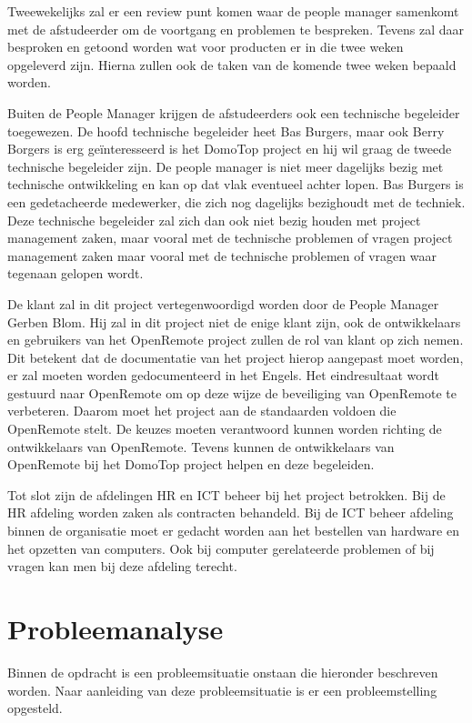 \documentclass[]{article}
\begin{document}
Tweewekelijks zal er een review punt komen waar de people manager
samenkomt met de afstudeerder om de voortgang en problemen te bespreken.
Tevens zal daar besproken en getoond worden wat voor producten er in die twee weken
opgeleverd zijn. Hierna zullen ook de taken van de komende twee weken
bepaald worden.

Buiten de People Manager krijgen de afstudeerders ook een technische
begeleider toegewezen. De hoofd technische begeleider heet Bas Burgers,
maar ook Berry Borgers is erg ge\"interesseerd is het DomoTop project en hij
wil graag de tweede technische begeleider zijn. De people manager is
niet meer dagelijks bezig met technische ontwikkeling en kan op dat vlak
eventueel achter lopen. Bas Burgers is een gedetacheerde medewerker, die zich nog
dagelijks bezighoudt met de techniek.
Deze technische begeleider zal zich dan ook niet bezig houden met 
project management zaken, maar vooral met de technische problemen of vragen
project management zaken maar vooral met de technische problemen of vragen
waar tegenaan gelopen wordt.

De klant zal in dit project vertegenwoordigd worden door de People Manager
Gerben Blom. Hij zal in dit project niet de enige klant zijn, ook de
ontwikkelaars en gebruikers van het OpenRemote project zullen de rol van klant
op zich nemen. Dit betekent dat de documentatie van het project hierop aangepast
moet worden, er zal moeten worden gedocumenteerd in het Engels.  
Het eindresultaat wordt gestuurd naar OpenRemote om op deze wijze de beveiliging
van OpenRemote te verbeteren. Daarom moet het project aan de standaarden voldoen die OpenRemote stelt. 
De keuzes moeten verantwoord kunnen worden richting de ontwikkelaars van
OpenRemote. Tevens kunnen de ontwikkelaars van OpenRemote bij het DomoTop project helpen en deze begeleiden.

Tot slot zijn de afdelingen HR en ICT beheer bij het project betrokken. Bij
de HR afdeling worden zaken als contracten behandeld. Bij de ICT beheer
afdeling binnen de organisatie moet er gedacht worden aan het bestellen van
hardware en het opzetten van computers. Ook bij computer gerelateerde problemen of
bij vragen kan men bij deze afdeling terecht.

\newpage
\section{Probleemanalyse}
Binnen de opdracht is een probleemsituatie onstaan die hieronder
beschreven worden. Naar aanleiding van deze probleemsituatie is er een
probleemstelling opgesteld.
\end{document}
